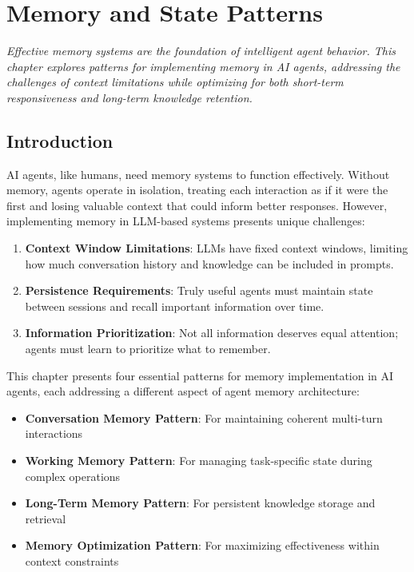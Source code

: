 \documentclass[11pt,oneside]{book}
\providecommand{\tightlist}{%
  \setlength{\itemsep}{0pt}\setlength{\parskip}{0pt}}
\begin{document}
\chapter{Memory and State Patterns}\label{memory-and-state-patterns}

\emph{Effective memory systems are the foundation of intelligent agent
behavior. This chapter explores patterns for implementing memory in AI
agents, addressing the challenges of context limitations while
optimizing for both short-term responsiveness and long-term knowledge
retention.}

\section{Introduction}\label{introduction-4}

AI agents, like humans, need memory systems to function effectively.
Without memory, agents operate in isolation, treating each interaction
as if it were the first and losing valuable context that could inform
better responses. However, implementing memory in LLM-based systems
presents unique challenges:

\begin{enumerate}
\def\labelenumi{\arabic{enumi}.}
\tightlist
\item
  \textbf{Context Window Limitations}: LLMs have fixed context windows,
  limiting how much conversation history and knowledge can be included
  in prompts.
\item
  \textbf{Persistence Requirements}: Truly useful agents must maintain
  state between sessions and recall important information over time.
\item
  \textbf{Information Prioritization}: Not all information deserves
  equal attention; agents must learn to prioritize what to remember.
\end{enumerate}

This chapter presents four essential patterns for memory implementation
in AI agents, each addressing a different aspect of agent memory
architecture:

\begin{itemize}
\tightlist
\item
  \textbf{Conversation Memory Pattern}: For maintaining coherent
  multi-turn interactions
\item
  \textbf{Working Memory Pattern}: For managing task-specific state
  during complex operations
\item
  \textbf{Long-Term Memory Pattern}: For persistent knowledge storage
  and retrieval
\item
  \textbf{Memory Optimization Pattern}: For maximizing effectiveness
  within context constraints
\end{itemize}
\end{document}
